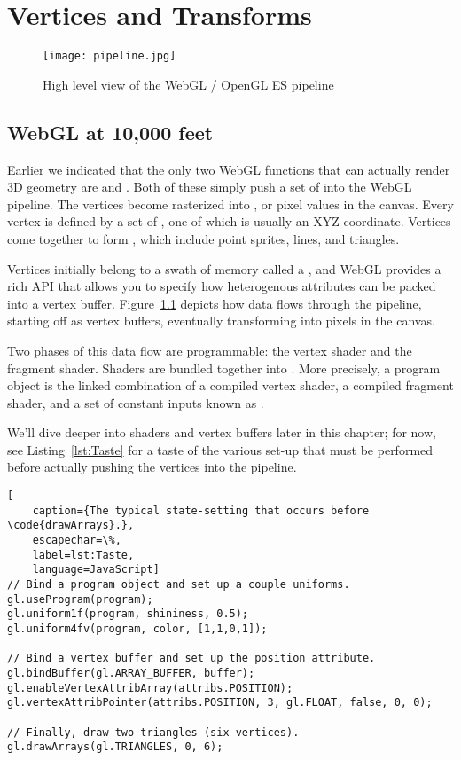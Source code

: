 \chapter{Vertices and Transforms}

\begin{figure}[htb]\centering
  \texttt{[image: pipeline.jpg]}
  \caption{High level view of the WebGL / OpenGL ES pipeline}
  \label{fig:AssemblyLine}
\end{figure}

\section{WebGL at 10,000 feet}

Earlier we indicated that the only two WebGL functions that can actually render 3D geometry are  and .  Both of these simply push a set of   into the WebGL pipeline.  The vertices become rasterized into  , or pixel values in the canvas.  Every vertex is defined by a set of , one of which is usually an XYZ coordinate.  Vertices come together to form , which include point sprites, lines, and triangles.

Vertices initially belong to a swath of memory called a , and WebGL provides a rich API that allows you to specify how heterogenous attributes can be packed into a vertex buffer.  Figure~\ref{fig:AssemblyLine} depicts how data flows through the pipeline, starting off as vertex buffers, eventually transforming into pixels in the canvas.

Two phases of this data flow are programmable: the vertex shader and the fragment shader.  Shaders are bundled together into  .   More precisely, a program object is the linked combination of a compiled vertex shader, a compiled fragment shader, and a set of constant inputs known as .

We'll dive deeper into shaders and vertex buffers later in this chapter; for now, see Listing~\ref{lst:Taste} for a taste of the various set-up that must be performed before actually pushing the vertices into the pipeline.

\begin{lstlisting}[
    caption={The typical state-setting that occurs before \code{drawArrays}.},
    escapechar=\%,
    label=lst:Taste,
    language=JavaScript]
// Bind a program object and set up a couple uniforms.
gl.useProgram(program);
gl.uniform1f(program, shininess, 0.5);
gl.uniform4fv(program, color, [1,1,0,1]);

// Bind a vertex buffer and set up the position attribute.
gl.bindBuffer(gl.ARRAY_BUFFER, buffer);
gl.enableVertexAttribArray(attribs.POSITION);
gl.vertexAttribPointer(attribs.POSITION, 3, gl.FLOAT, false, 0, 0);

// Finally, draw two triangles (six vertices).
gl.drawArrays(gl.TRIANGLES, 0, 6);
\end{lstlisting}


